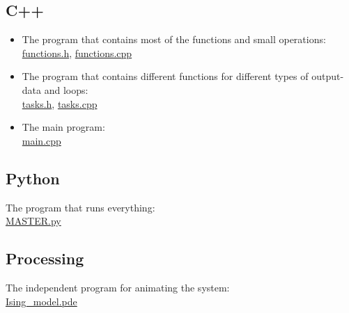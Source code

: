 \documentclass[twoside,utf8]{article}
\begin{document}
\subsection{C++}
\begin{itemize}
\item 
The program that contains most of the functions and small operations: \\
\href{
https://github.com/augustge/proj4/blob/FinalBranch/projectFour/functions.h 
}{functions.h},
\href{
https://github.com/augustge/proj4/blob/FinalBranch/projectFour/functions.cpp
}{functions.cpp}
 
\item 
The program that contains different functions for different types of output-data and loops: \\
\href{
https://github.com/augustge/proj4/blob/FinalBranch/projectFour/tasks.h
}{tasks.h},
\href{
https://github.com/augustge/proj4/blob/FinalBranch/projectFour/tasks.cpp
}{tasks.cpp}


\item 
The main program: \\
\href{
https://github.com/augustge/proj4/blob/FinalBranch/projectFour/main.cpp
}{main.cpp}

\end{itemize}

\subsection{Python}
The program that runs everything: \\
\href{
https://github.com/augustge/proj4/blob/FinalBranch/MASTER.py
}{MASTER.py}

\subsection{Processing}
The independent program for animating the system: \\
\href{
https://github.com/augustge/proj4/blob/FinalBranch/IsingAnimation/Ising_model/Ising_model.pde
}{Ising\_model.pde}
\end{document}
